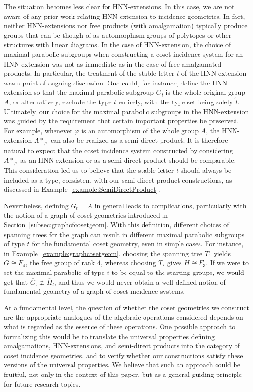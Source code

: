 \documentclass[11pt,letterpaper]{amsart}
\begin{document}
The situation becomes less clear for HNN-extensions. In this case, we are not aware of any prior work relating HNN-extension to incidence geometries. In fact, neither HNN-extensions nor free products (with amalgamation) typically produce groups that can be though of as automorphism groups of polytopes or other structures with linear diagrams.
In the case of HNN-extension, the choice of maximal parabolic subgroups when constructing a coset incidence system for an HNN-extension was not as immediate as in the case of free amalgamated products. In particular, the treatment of the stable letter $t$ of the HNN-extension was a point of ongoing discussion. One could, for instance, define the HNN-extension so that the maximal parabolic subgroup $G_t$ is the whole original group $A$, or alternatively, exclude the type $t$ entirely, with the type set being solely $\widetilde{I}$. Ultimately, our choice for the maximal parabolic subgroups in the HNN-extension was guided by the requirement that certain important properties be preserved. For example, whenever $\varphi$ is an automorphism of the whole group $A$, the HNN-extension $A*_\varphi$ can also be realized as a semi-direct product. It is therefore natural to expect that the coset incidence system constructed by considering $A*_\varphi$ as an HNN-extension or as a semi-direct product should be comparable. This consideration led us to believe that the stable letter $t$ should always be included as a type, consistent with our semi-direct product constructions, as discussed in Example~\ref{example:SemiDirectProduct}.

Nevertheless, defining $G_t = A$ in general leads to complications, particularly with the notion of a graph of coset geometries introduced in Section~\ref{subsec:graphofcosetgeom}. With this definition, different choices of spanning trees for the graph can result in different maximal parabolic subgroups of type $t$ for the fundamental coset geometry, even in simple cases. For instance, in Example~\ref{example:graphcosetgeom}, choosing the spanning tree $T_1$ yields $G \cong F_4$, the free group of rank $4$, whereas choosing $T_2$ gives $H \cong F_3$. If we were to set the maximal parabolic of type $t$ to be equal to the starting groups, we would get that $\overline{G}_t\ncong \overline{H}_t$, and thus we would never obtain a well defined notion of fundamental geometry of a graph of coset incidence systems. 

At a fundamental level, the question of whether the coset geometries we construct are the appropriate analogues of the algebraic operations considered depends on what is regarded as the essence of these operations. One possible approach to formalizing this would be to translate the universal properties defining amalgamations, HNN-extensions, and semi-direct products into the category of coset incidence geometries, and to verify whether our constructions satisfy these versions of 
the universal properties. We believe that such an approach could be fruitful, not only in the context of this paper, but as a general guiding principle for future research topics.
\end{document}
